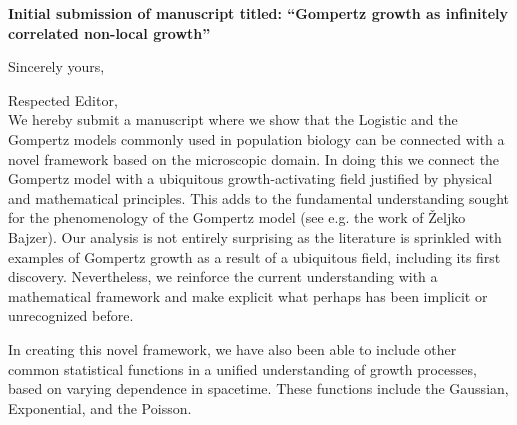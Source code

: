 \documentclass[11pt,a4paper,roman]{moderncv}
\begin{document}
\date{\today}
\opening{\textbf{Initial submission of manuscript titled: ``Gompertz growth as infinitely correlated non-local growth''}}
\closing{Sincerely yours, \vspace{-1em}}


\makelettertitle



Respected Editor,
\\
\vspace{1em}
We hereby submit a manuscript where we show that the Logistic and the Gompertz models commonly used in population biology can be connected with a novel framework based on the microscopic domain. In doing this we connect the Gompertz model with a ubiquitous growth-activating field justified by physical and mathematical principles. This adds to the fundamental understanding sought for the phenomenology of the Gompertz model (see e.g. the work of Željko Bajzer). Our analysis is not entirely surprising as the literature is sprinkled with examples of Gompertz growth as a result of a ubiquitous field, including its first discovery. Nevertheless, we reinforce the current understanding with a mathematical framework and make explicit what perhaps has been implicit or unrecognized before. 

In creating this novel framework, we have also been able to include other common statistical functions in a unified understanding of growth processes, based on varying dependence in spacetime. These functions include the Gaussian, Exponential, and the Poisson.
\end{document}
